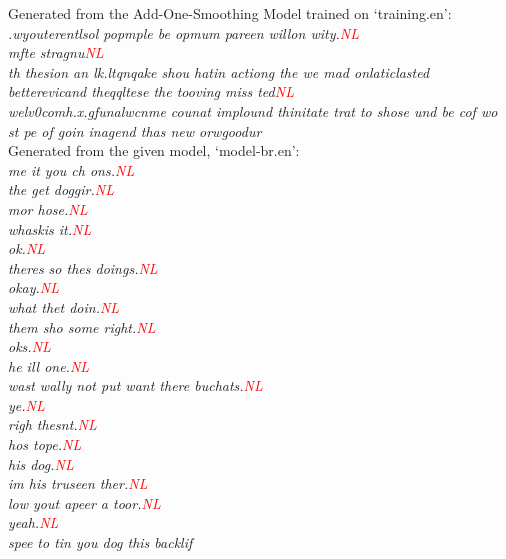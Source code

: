 \documentclass[12pt]{article}
\begin{document}
Generated from the Add-One-Smoothing Model trained on `training.en':\\
\hfill\break
\textit{.wyouterentlsol popmple be opmum pareen willon wity.\textcolor{red}{NL}\\
	mfte stragnu\textcolor{red}{NL}\\
	th thesion an lk.ltqnqake shou hatin actiong the we mad onlaticlasted betterevicand theqqltese the tooving miss ted\textcolor{red}{NL}\\
	welv0comh.x.gfunalwcnme counat implound thinitate trat to shose und be cof wo st pe of goin inagend thas new orwgoodur\\}
\hfill\break
Generated from the given model, `model-br.en':\\
\hfill\break
\textit{me it you ch ons.\textcolor{red}{NL}\\
	the get doggir.\textcolor{red}{NL}\\
	mor hose.\textcolor{red}{NL}\\
	whaskis it.\textcolor{red}{NL}\\
	ok.\textcolor{red}{NL}\\
	theres so thes doings.\textcolor{red}{NL}\\
	okay.\textcolor{red}{NL}\\
	what thet doin.\textcolor{red}{NL}\\
	them sho some right.\textcolor{red}{NL}\\
	oks.\textcolor{red}{NL}\\
	he ill one.\textcolor{red}{NL}\\
	wast wally not put want there buchats.\textcolor{red}{NL}\\
	ye.\textcolor{red}{NL}\\
	righ thesnt.\textcolor{red}{NL}\\
	hos tope.\textcolor{red}{NL}\\
	his dog.\textcolor{red}{NL}\\
	im his truseen ther.\textcolor{red}{NL}\\
	low yout apeer a toor.\textcolor{red}{NL}\\
	yeah.\textcolor{red}{NL}\\
	spee to tin you dog this backlif}
\end{document}
